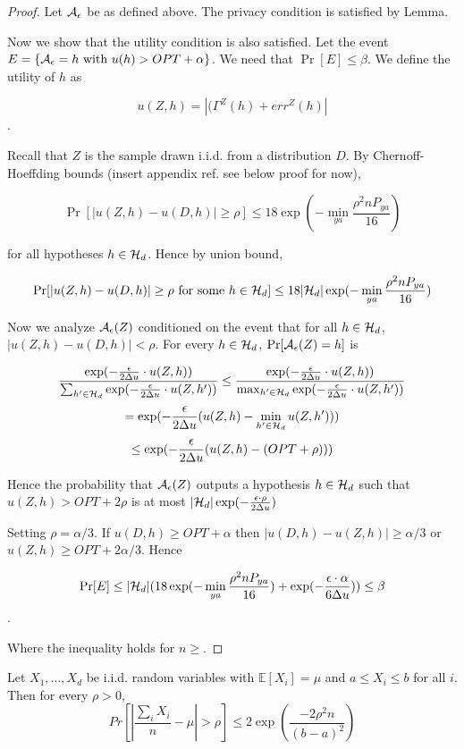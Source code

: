 \begin{proof}
	Let $\mathcal{A}_{\epsilon}$ be as defined above. The privacy condition is
	satisfied by Lemma.
	
	Now we show that the utility condition is also satisfied. Let the
	event $E = \{\mathcal{A}_{\epsilon} = h \text{ with } u(h) > OPT + \alpha\}$. We
	need that $\Pr[E] \leq \beta$. We define the utility of $h$ as
	
	$$u(Z,h) = |(\Gamma^Z(h) + err^Z(h)|$$.
	
	Recall that $Z$ is the sample drawn i.i.d. from a distribution $D$.
	By Chernoff-Hoeffding bounds (insert appendix ref. see below proof
	for now),
	
	$$\Pr[|u(Z,h) - u(D,h)| \geq \rho] \leq 18\exp(-\min_{ya}{\frac{\rho^2 n P_{ya}}{16}})$$
	
	for all hypotheses $h \in \mathcal{H}_d$. Hence by union bound,
	
	$$\Pr[|u(Z,h) - u(D,h)| \geq \rho \text{ for some } h \in \mathcal{H}_d] \leq 18|\mathcal{H}_d|\exp(-\min_{ya}{\frac{\rho^2 n P_{ya}}{16}})$$
	
	Now we analyze $\mathcal{A}_\epsilon(Z)$ conditioned on the event that for all
	$h\in \mathcal{H}_d$, $|u(Z,h) - u(D,h)| < \rho$. For every $h \in \mathcal{H}_d$, $\Pr[\mathcal{A}_\epsilon(Z) = h]$ is
	
	$$\frac{\exp(-\frac{\epsilon}{2\Delta u} \cdot
		u(Z,h))}{\sum_{h'\in\mathcal{H}_d}\exp(-\frac{\epsilon}{2\Delta u} \cdot u(Z,h'))}
	\leq \frac{\exp(-\frac{\epsilon}{2\Delta u} \cdot
		u(Z,h))}{\max_{h'\in\mathcal{H}_d}\exp(-\frac{\epsilon}{2\Delta u} \cdot u(Z,h'))} $$
	$$= \exp(-\frac{\epsilon}{2\Delta u}(u(Z,h) - \min_{h'\in\mathcal{H}_d}u(Z,h')))$$
	$$\leq \exp(-\frac{\epsilon}{2\Delta u}(u(Z,h) - (OPT + \rho)))$$
	
	Hence the probability that $\mathcal{A}_\epsilon(Z)$ outputs a hypothesis $h \in
	\mathcal{H}_d$ such that $u(Z,h) > OPT + 2\rho$ is at most
	$|\mathcal{H}_d|\exp(-\frac{\epsilon\cdot\rho}{2\Delta u})$
	
	Setting $\rho = \alpha/3$. If $u(D,h) \geq OPT + \alpha$ then
	$|u(D,h) - u(Z,h)| \geq \alpha/3$ or $u(Z,h) \geq OPT + 2\alpha/3$.
	Hence
	
	$$\Pr[E] \leq |\mathcal{H}_d|(18\exp(-\min_{ya}{\frac{\rho^2 n P_{ya}}{16}}) + \exp(-\frac{\epsilon\cdot\alpha}{6\Delta u})) \leq \beta$$.
	
	Where the inequality holds for $n \geq $.
\end{proof}
\begin{theorem}
	Let $X_1,...,X_d$ be i.i.d. random variables with $\mathbb{E}[X_i] = \mu$ and $a \leq X_i \leq b$ for all $i$. Then for every $\rho > 0$,
	$$Pr[|\frac{\sum_i X_i}{n} - \mu| > \rho] \leq 2\exp(\frac{-2\rho^2n}{(b-a)^2})$$
\end{theorem}


